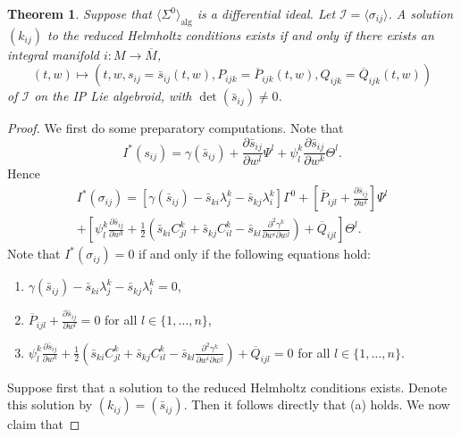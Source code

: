 \documentclass[11pt]{article}
\theoremstyle{plain}
\newtheorem{theorem}{Theorem}
\theoremstyle{definition}
\begin{document}
\begin{theorem}\label{thm:helmholtzintmfd}
  Suppose that $\langle \Sigma^0\rangle_{\mathrm{alg}}$ is a differential ideal. Let $\mathcal{I}=\langle \sigma_{ij}\rangle$. A solution $(k_{ij})$ to the reduced Helmholtz conditions exists if and only if there exists an integral manifold $i\colon M\to \overline{M}$,
\begin{equation*}
    (t,w)\longmapsto \left(t,w,s_{ij}=\bar{s}_{ij}(t,w),P_{ijk}=\overline{P}_{ijk}(t,w),Q_{ijk}=\overline{Q}_{ijk}(t,w)\right)
\end{equation*}
of $\mathcal{I}$ on  the IP Lie algebroid, with $\det(\bar{s}_{ij})\neq 0$.
\end{theorem}
\begin{proof}
We first do some preparatory computations. Note that
\begin{equation*}
    I^{\ast}(s_{ij})=\gamma(\bar{s}_{ij})+\frac{\partial \bar{s}_{ij}}{\partial w^l}\Psi^l+\psi_l^k \frac{\partial \bar{s}_{ij}}{\partial w^k}\Theta^l.
\end{equation*}
Hence
\begin{multline*}
    I^{\ast}(\sigma_{ij})=\left[\gamma(\bar{s}_{ij})-\bar{s}_{ki}\lambda_j^k-\bar{s}_{kj}\lambda_i^k\right]\Gamma^0+\left[\overline{P}_{ijl}+\frac{\partial \bar{s}_{ij}}{\partial w^l}\right]\Psi^l\\+\left[\psi_l^k \frac{\partial \bar{s}_{ij}}{\partial w^k}+\frac{1}{2}\left(\bar{s}_{ki}C_{jl}^k+\bar{s}_{kj}C_{il}^k-\bar{s}_{kl}\frac{\partial^2 \gamma^k}{\partial w^i \partial w^j}\right)+\overline{Q}_{ijl}\right]\Theta^l.
\end{multline*}
Note that $I^{\ast}(\sigma_{ij})=0$  if and only if the following equations hold:
\begin{enumerate}[label=(\alph*)]
    \item $\gamma(\bar{s}_{ij})-\bar{s}_{ki}\lambda_j^k-\bar{s}_{kj}\lambda_i^k=0$,
    \item $\overline{P}_{ijl}+\frac{\partial \bar{s}_{ij}}{\partial w^l}=0$ for all $l\in \{1,\dots,n\}$,
    \item $\psi_l^k \frac{\partial \bar{s}_{ij}}{\partial w^k}+\frac{1}{2}\left(\bar{s}_{ki}C_{jl}^k+\bar{s}_{kj}C_{il}^k-\bar{s}_{kl}\frac{\partial^2 \gamma^k}{\partial w^i \partial w^j}\right)+\overline{Q}_{ijl}=0$ for all $l\in \{1,\dots,n\}$.
\end{enumerate}
Suppose first that a solution to the reduced Helmholtz conditions exists. Denote this solution by $(k_{ij})=(\bar{s}_{ij})$. Then it follows directly that (a) holds. We now claim that

\end{proof}
\end{document}
